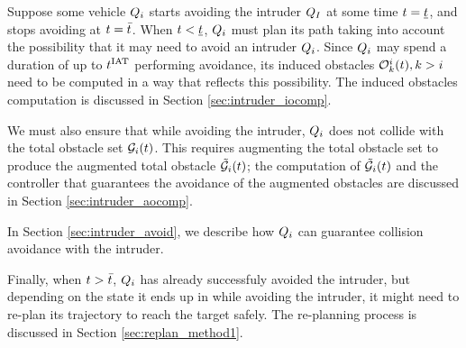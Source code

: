 Suppose some vehicle $Q_i$ starts avoiding the intruder $Q_{I}$ at some time $t = \underline{t}$, and stops avoiding at $t = \bar{t}$. When $t < \underline{t}$, $Q_i$ must plan its path taking into account the possibility that it may need to avoid an intruder $Q_i$. Since $Q_i$ may spend a duration of up to $t^\text{IAT}$ performing avoidance, its induced obstacles $\mathcal{O}_k^i(t), k>i$ need to be computed in a way that reflects this possibility. The induced obstacles computation is discussed in Section \ref{sec:intruder_iocomp}.

We must also ensure that while avoiding the intruder, $Q_i$ does not collide with the total obstacle set $\mathcal{G}_i(t)$. This requires augmenting the total obstacle set to produce the augmented total obstacle $\tilde{\mathcal{G}}_i(t)$; the computation of $\tilde{\mathcal{G}}_i(t)$ and the controller that guarantees the avoidance of the augmented obstacles are discussed in Section \ref{sec:intruder_aocomp}.

In Section \ref{sec:intruder_avoid}, we describe how $Q_i$ can guarantee collision avoidance with the intruder.

Finally, when $t > \bar{t}$, $Q_i$ has already successfuly avoided the intruder, but depending on the state it ends up in while avoiding the intruder, it might need to re-plan its trajectory to reach the target safely. The re-planning process is discussed in Section \ref{sec:replan_method1}.

